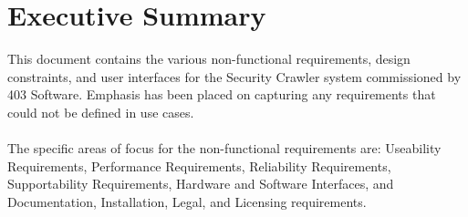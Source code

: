 \section{Executive Summary}
This document contains the various non-functional requirements, design constraints, and user interfaces for the Security Crawler system commissioned by 403 Software.  Emphasis has been placed on capturing any requirements that could not be defined in use cases.\\\\
The specific areas of focus for the non-functional requirements are:  Useability Requirements, Performance Requirements, Reliability Requirements, Supportability Requirements, Hardware and Software Interfaces, and Documentation, Installation, Legal, and Licensing requirements.

